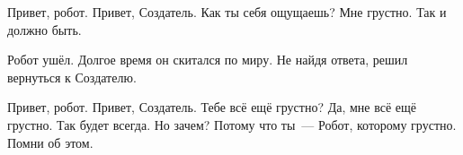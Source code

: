 \begin{dialog}
\X Привет, робот.
\R Привет, Создатель.
\X Как ты себя ощущаешь?
\R Мне грустно.
\X Так и должно быть.
\end{dialog}

\begin{monolog}
Робот ушёл. Долгое время он скитался по миру. Не найдя ответа, решил вернуться к Создателю.
\end{monolog}
	
\begin{dialog}
\X Привет, робот.
\R Привет, Создатель.
\X Тебе всё ещё грустно?
\R Да, мне всё ещё грустно.
\X Так будет всегда.
\R Но зачем?
\X Потому что ты~--- Робот, которому грустно. Помни об этом.
\end{dialog}
